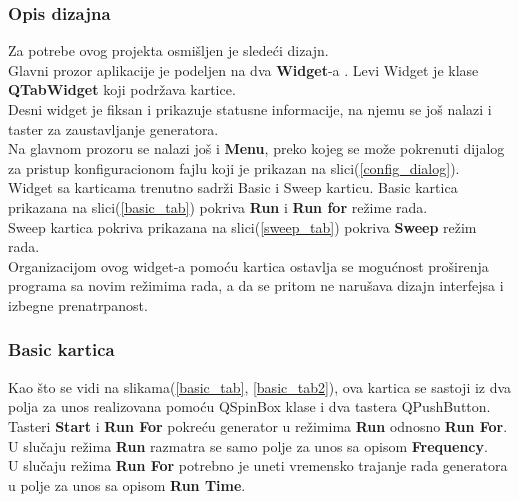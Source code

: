 \subsubsection{Opis dizajna}
Za potrebe ovog projekta osmišljen je sledeći dizajn. \\
Glavni prozor aplikacije je podeljen na dva \textbf{Widget}-a \cite{QWidget}.
Levi Widget je klase \textbf{QTabWidget} koji podržava kartice. \\
Desni widget je fiksan i prikazuje statusne informacije, na njemu se još nalazi
i taster za zaustavljanje generatora. \\
Na glavnom prozoru se nalazi još i \textbf{Menu}\cite{QMenu}, preko kojeg se
može pokrenuti dijalog za pristup konfiguracionom fajlu koji je prikazan na
slici(\ref{config_dialog}). \\

Widget sa karticama trenutno sadrži Basic i Sweep karticu. Basic kartica
prikazana na slici(\ref{basic_tab}) pokriva
\textbf{Run} i \textbf{Run for} režime rada. \\
Sweep kartica pokriva prikazana na slici(\ref{sweep_tab}) pokriva \textbf{Sweep}
režim rada. \\

Organizacijom ovog widget-a pomoću kartica ostavlja se mogućnost proširenja programa
sa novim režimima rada, a da se pritom ne narušava dizajn interfejsa i izbegne
prenatrpanost. \\


\subsubsection{Basic kartica}

Kao što se vidi na slikama(\ref{basic_tab}, \ref{basic_tab2}), ova kartica se
sastoji iz dva polja za unos realizovana pomoću QSpinBox\cite{QSpinBox} klase i
dva tastera QPushButton\cite{QPushButton}. \\

Tasteri \textbf{Start} i \textbf{Run For} pokreću generator u režimima \textbf{Run} odnosno \textbf{Run For}. \\
U slučaju režima \textbf{Run} razmatra se samo polje za unos sa opisom
\textbf{Frequency}. \\
U slučaju režima \textbf{Run For} potrebno je uneti vremensko trajanje rada generatora u
polje za unos sa opisom \textbf{Run Time}. \\
\begin{figure}[H]
\end{figure}

